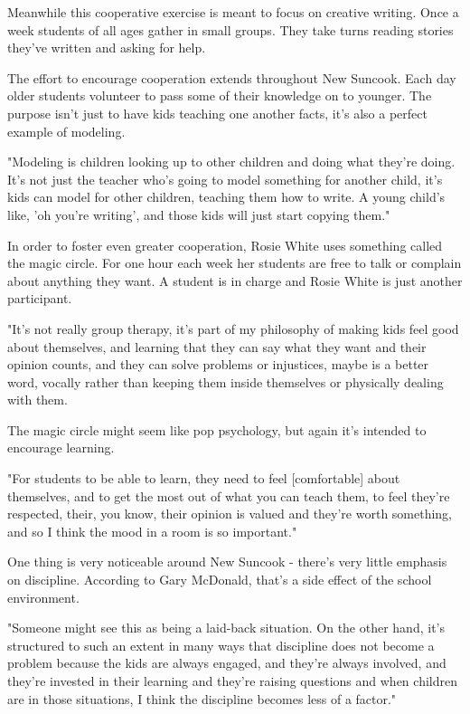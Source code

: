 Meanwhile this cooperative exercise is meant to focus on creative writing. Once a week students of all ages gather in small groups. They take turns reading stories they've written and asking for help.

The effort to encourage cooperation extends throughout New Suncook. Each day older students volunteer to pass some of their knowledge on to younger. The purpose isn't just to have kids teaching one another facts, it's also a perfect example of modeling.

"Modeling is children looking up to other children and doing what they're doing. It's not just the teacher who's going to model something for another child, it's kids can model for other children, teaching them how to write. A young child's like, 'oh you're writing', and those kids will just start copying them."

In order to foster even greater cooperation, Rosie White uses something called the magic circle. For one hour each week her students are free to talk or complain about anything they want. A student is in charge and Rosie White is just another participant.

"It's not really group therapy, it's part of my philosophy of making kids feel good about themselves, and learning that they can say what they want and their opinion counts, and they can solve problems or injustices, maybe is a better word, vocally rather than keeping them inside themselves or physically dealing with them.

The magic circle might seem like pop psychology, but again it's intended to encourage learning.

"For students to be able to learn, they need to feel [comfortable] about themselves, and to get the most out of what you can teach them, to feel they're respected, their, you know, their opinion is valued and they're worth something, and so I think the mood in a room is so important."

One thing is very noticeable around New Suncook - there's very little emphasis on discipline. According to Gary McDonald, that's a side effect of the school environment.

"Someone might see this as being a laid-back situation. On the other hand, it's structured to such an extent in many ways that discipline does not become a problem because the kids are always engaged, and they're always involved, and they're invested in their learning and they're raising questions and when children are in those situations, I think the discipline becomes less of a factor."

